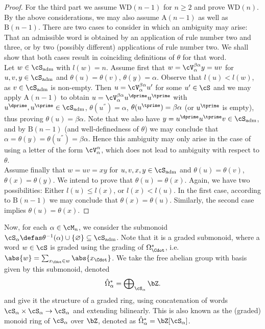 \begin{lem}
\begin{proof}
For the third part we assume $\mathrm{WD}(n-1)$ for $n \geq 2$ and prove $\mathrm{WD}(n)$. By the above considerations, we may also assume $\mathrm{A}(n-1)$ as well as $\mathrm{B}(n-1)$. There are two cases to consider in which an ambiguity may arise: That an admissible word is obtained by an application of rule number two and three, or by two (possibly different) applications of rule number two. We shall show that both cases result in coinciding definitions of $\theta$ for that word.\\
Let $w \in \cS_\mathrm{adm}$ with $l(w)=n$. Assume first that $w = \cV_\alpha^{\beta\alpha} y = uv$ for $u,v,y \in \cS_\mathrm{adm}$ and $\theta(u) = \theta(v)$, $\theta(y) = \alpha$. Observe that $l(u) < l(w)$, as $v \in \cS_\mathrm{adm}$ is non-empty. Then $u = \cV_\alpha^{\beta\alpha} u^\prime$ for some $u^\prime \in \cS$ and we may apply $\mathrm{A}(n-1)$ to obtain $u = \cV_\alpha^{\beta\alpha} u^\dprime u^\tprime$ with $u^\dprime, u^\tprime \in \cS_\mathrm{adm}$, $\theta(u^\dprime) = \alpha$, $\theta(u^\tprime) = \beta\alpha$ (or $u^\tprime$ is empty), thus proving $\theta(u) = \beta\alpha$. Note that we also have $y = u^\dprime u^\tprime v \in \cS_\mathrm{adm}$, and by $\mathrm{B}(n-1)$ (and well-definedness of $\theta$) we may conclude that $\alpha = \theta(y) = \theta(u^\dprime) = \beta \alpha$. Hence this ambiguity may only arise in the case of using a letter of the form $\cV_\alpha^\alpha$, which does not lead to ambiguity with respect to $\theta$.\\
Assume finally that $w = uv = xy$ for $u,v,x,y \in \cS_\mathrm{adm}$ and $\theta(u) = \theta(v)$, $\theta(x) = \theta(y)$. We intend to prove that $\theta(u) = \theta(x)$. Again, we have two possibilities: Either $l(u) \leq l(x)$, or $l(x) < l(u)$. In the first case, according to $\mathrm{B}(n-1)$ we may conclude that $\theta(x) = \theta(u)$. Similarly, the second case implies $\theta(u) = \theta(x)$.
\end{proof}
\end{lem}
%
%
\begin{defn}
Now, for each $\alpha \in \cM_n$, we consider the submonoid $\cS_\alpha \defas \theta^{-1}(\alpha) \cup \{\varnothing\} \subseteq \cS_{\mathrm{adm}}$. Note that it is a graded submonoid, where a word $w \in \cS$ is graded using the grading of $\Omega^*_{\Cdot}$, i.e. $\abs{w} = \sum_{x_{\Cdot} \in w} \abs{x_{\Cdot}}$. We take the free abelian group with basis given by this submonoid, denoted
\begin{equation*}
  \hat\Omega^*_\alpha = \bigoplus\nolimits_{\cS_\alpha} \bZ.
\end{equation*}
and give it the structure of a graded ring, using concatenation of words $\cS_\alpha \times \cS_\alpha \to \cS_\alpha$ and extending bilinearly. This is also known as the (graded) monoid ring of $\cS_\alpha$ over $\bZ$, denoted as $\hat \Omega^*_\alpha = \bZ[\cS_\alpha]$.
\end{defn}
